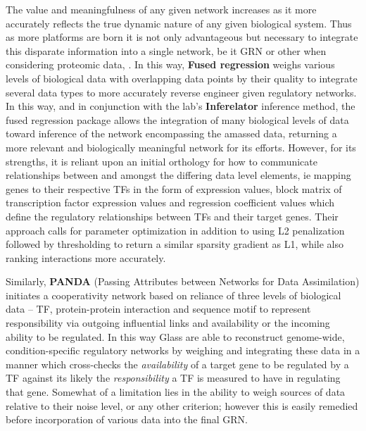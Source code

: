 The value and meaningfulness of any given network increases as it more accurately reflects the true dynamic nature of any given biological system. Thus as more platforms are born it is not only advantageous but necessary to integrate this disparate information into a single network, be it GRN or other when considering \eg proteomic data, \etc. In this way, \textbf{Fused regression} \citep{lam2016fused} weighs various levels of biological data with overlapping data points by their quality to integrate several data types to more accurately reverse engineer given regulatory networks. In this way, and in conjunction with the lab's \textbf{Inferelator}\citep{bonneau2006inferelator} inference method, the fused regression package allows the integration of many biological levels of data toward inference of the network encompassing the amassed data, returning a more relevant and biologically meaningful network for its efforts. However, for its strengths, it is reliant upon an initial orthology for how to communicate relationships between and amongst the differing data level elements, ie mapping genes to their respective TFs in the form of expression values, block matrix of transcription factor expression values and regression coefficient values which define the regulatory relationships between TFs and their target genes. Their approach  calls for parameter optimization in addition to using L2 penalization followed by thresholding to return a similar sparsity gradient as L1, while also ranking interactions more accurately.

Similarly, \textbf{PANDA} (Passing Attributes between Networks for Data Assimilation) \citep{glass2013passing} initiates a cooperativity network based on reliance of three levels of biological data -- TF, protein-protein interaction and sequence motif to represent responsibility via outgoing influential links and availability or the incoming ability to be regulated. In this way Glass \etal are able to reconstruct genome-wide, condition-specific regulatory networks by weighing and integrating these data in a manner which cross-checks the \emph{availability} of a target gene to be regulated by a TF against its likely the \emph{responsibility} a TF is measured to have in regulating that gene. Somewhat of a limitation lies in the ability to weigh sources of data relative to their noise level, or any other criterion; however this is easily remedied before incorporation of various data into the final GRN.


